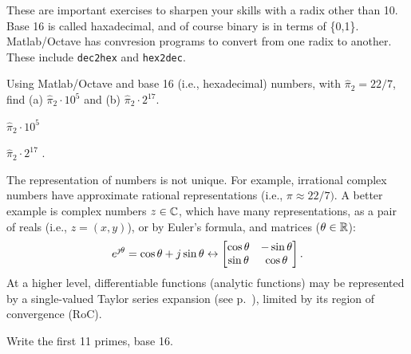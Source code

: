 \documentclass{ximera}
\begin{document}
These are important exercises to sharpen your skills with a radix other than 10. Base 16 is called
haxadecimal, and of course binary is in terms of \{0,1\}.
Matlab/Octave has convresion programs to convert from one radix to another.
These include \texttt{\small dec2hex} and \texttt{\small hex2dec}.


\BEx
Using Matlab/Octave and base 16 (i.e., hexadecimal) numbers, with $\hat{\pi}_2 = 22/7$, find (a) $\hat{\pi}_2 \cdot 10^5$ and (b) $\hat{\pi}_2 \cdot 2^{17}$.
 \Be
\item $\hat{\pi}_2 \cdot 10^5$


\item $\hat{\pi}_2 \cdot 2^{17}$
. 
 \Ee
\EEx

The representation of numbers is not unique. For example, irrational complex numbers have approximate
rational representations (i.e., $\pi \approx 22/7)$. A better example is complex numbers $z\in\mathbb{C}$, which
have many representations, as a pair of reals (i.e., $z=(x,y)$), or by Euler's formula,
and matrices ($\theta\in\mathbb{R}$):
 \[
 e^{\jmath\theta}= \cos{\theta} + j\sin{\theta}
	\leftrightarrow
 \begin{bmatrix} \cos\theta & -\sin\theta \\ \sin\theta & \cos\theta \end{bmatrix}.
 \]
At a higher level, differentiable functions (analytic functions) may be represented by a
single-valued Taylor series expansion (see p.~\pageref{Sect:TaylorSeries}),
limited by its region of convergence (RoC).


\BEx %
Write the first 11 primes, base 16.

\EEx
\end{document}
